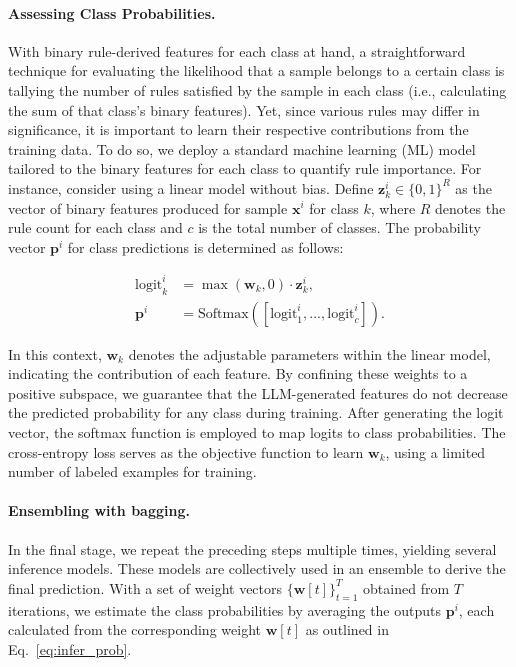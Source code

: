 \paragraph{Assessing Class Probabilities.} With binary rule-derived features for each class at hand, a straightforward technique for evaluating the likelihood that a sample belongs to a certain class is tallying the number of rules satisfied by the sample in each class (i.e., calculating the sum of that class’s binary features). Yet, since various rules may differ in significance, it is important to learn their respective contributions from the training data. To do so, we deploy a standard machine learning (ML) model tailored to the binary features for each class to quantify rule importance. For instance, consider using a linear model without bias. Define $\mathbf{z}_k^i \in \{0, 1\}^R$ as the vector of binary features produced for sample $\mathbf{x}^i$ for class $k$, where $R$ denotes the rule count for each class and $c$ is the total number of classes. The probability vector $\mathbf{p}^i$ for class predictions is determined as follows:

\begin{align}
\text{logit}_k^i &= \max(\mathbf{w}_k, 0) \cdot \mathbf{z}_k^i, \nonumber \\
\mathbf{p}^i &= \text{Softmax}({[\text{logit}_{1}^i, ..., \text{logit}_{c}^i]}). \label{eq:infer_prob}
\end{align}

In this context, $\mathbf{w}_k$ denotes the adjustable parameters within the linear model, indicating the contribution of each feature. By confining these weights to a positive subspace, we guarantee that the LLM-generated features do not decrease the predicted probability for any class during training. After generating the logit vector, the softmax function is employed to map logits to class probabilities. The cross-entropy loss serves as the objective function to learn $\mathbf{w}_k$, using a limited number of labeled examples for training.

\vspace*{-0.12in}
\paragraph{Ensembling with bagging.} In the final stage, we repeat the preceding steps multiple times, yielding several inference models. These models are collectively used in an ensemble to derive the final prediction. With a set of weight vectors $\{\mathbf{w}[t]\}_{t=1}^T$ obtained from $T$ iterations, we estimate the class probabilities by averaging the outputs $\mathbf{p}^i$, each calculated from the corresponding weight $\mathbf{w}[t]$ as outlined in Eq.~\ref{eq:infer_prob}.


